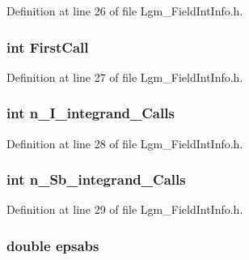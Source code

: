 Definition at line 26 of file Lgm\_\-FieldIntInfo.h.\hypertarget{struct_lgm___field_int_info_52587930b11ea1eb053f0306dbc7973e}{
\subsubsection[{FirstCall}]{\setlength{\rightskip}{0pt plus 5cm}int {\bf FirstCall}}}
\label{struct_lgm___field_int_info_52587930b11ea1eb053f0306dbc7973e}




Definition at line 27 of file Lgm\_\-FieldIntInfo.h.\hypertarget{struct_lgm___field_int_info_5c3c9425f92b88e4cb8d1ee9129761d8}{
\subsubsection[{n\_\-I\_\-integrand\_\-Calls}]{\setlength{\rightskip}{0pt plus 5cm}int {\bf n\_\-I\_\-integrand\_\-Calls}}}
\label{struct_lgm___field_int_info_5c3c9425f92b88e4cb8d1ee9129761d8}




Definition at line 28 of file Lgm\_\-FieldIntInfo.h.\hypertarget{struct_lgm___field_int_info_1f89d256729806dd1da1e84501e8d036}{
\subsubsection[{n\_\-Sb\_\-integrand\_\-Calls}]{\setlength{\rightskip}{0pt plus 5cm}int {\bf n\_\-Sb\_\-integrand\_\-Calls}}}
\label{struct_lgm___field_int_info_1f89d256729806dd1da1e84501e8d036}




Definition at line 29 of file Lgm\_\-FieldIntInfo.h.\hypertarget{struct_lgm___field_int_info_6aa234e3efbe6cefea9099de9f303f49}{
\subsubsection[{epsabs}]{\setlength{\rightskip}{0pt plus 5cm}double {\bf epsabs}}}
\label{struct_lgm___field_int_info_6aa234e3efbe6cefea9099de9f303f49}




